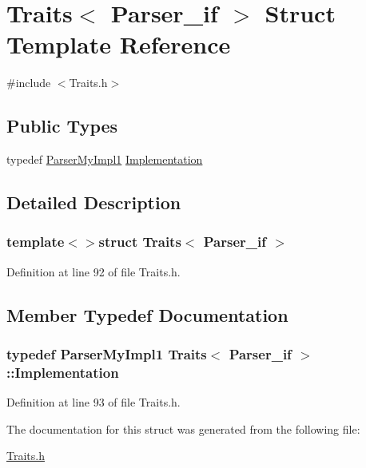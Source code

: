 \hypertarget{struct_traits_3_01_parser__if_01_4}{\section{Traits$<$ Parser\-\_\-if $>$ Struct Template Reference}
\label{struct_traits_3_01_parser__if_01_4}
}


{\ttfamily \#include $<$Traits.\-h$>$}

\subsection*{Public Types}
\begin{DoxyCompactItemize}
\item 
typedef \hyperlink{class_parser_my_impl1}{Parser\-My\-Impl1} \hyperlink{struct_traits_3_01_parser__if_01_4_ad255fa4d0635c0fd54986d3c2e8f53da}{Implementation}
\end{DoxyCompactItemize}


\subsection{Detailed Description}
\subsubsection*{template$<$$>$struct Traits$<$ Parser\-\_\-if $>$}



Definition at line 92 of file Traits.\-h.



\subsection{Member Typedef Documentation}
\hypertarget{struct_traits_3_01_parser__if_01_4_ad255fa4d0635c0fd54986d3c2e8f53da}{
\subsubsection[{Implementation}]{\setlength{\rightskip}{0pt plus 5cm}typedef {\bf Parser\-My\-Impl1} {\bf Traits}$<$ {\bf Parser\-\_\-if} $>$\-::{\bf Implementation}}}\label{struct_traits_3_01_parser__if_01_4_ad255fa4d0635c0fd54986d3c2e8f53da}


Definition at line 93 of file Traits.\-h.



The documentation for this struct was generated from the following file\-:\begin{DoxyCompactItemize}
\item 
\hyperlink{_traits_8h}{Traits.\-h}\end{DoxyCompactItemize}
